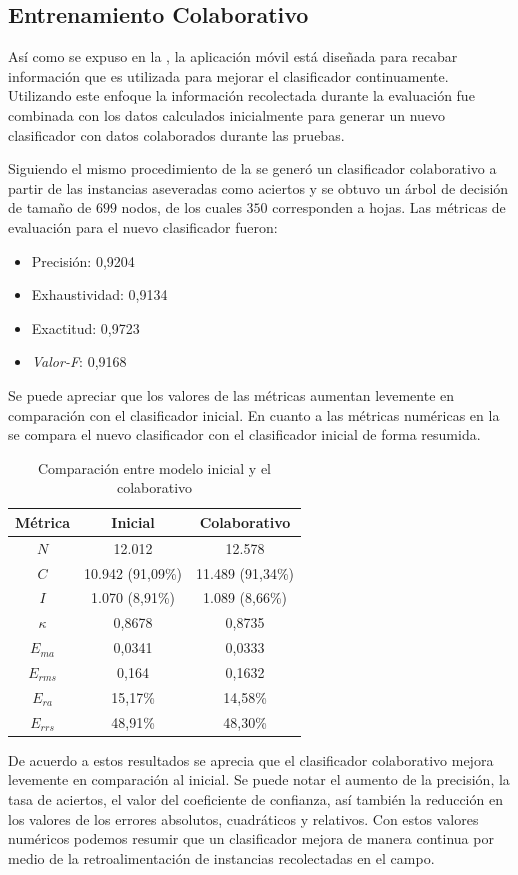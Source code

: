 \subsection{Entrenamiento Colaborativo}

\label{ssec6:colaboracion}Así como se expuso en la ,
la aplicación móvil \emph{} está diseñada para
recabar información que es utilizada para mejorar el clasificador
continuamente. Utilizando este enfoque la información recolectada
durante la evaluación fue combinada con los datos calculados inicialmente
para generar un nuevo clasificador con datos colaborados durante las
pruebas.

Siguiendo el mismo procedimiento de la 
se generó un clasificador colaborativo a partir de las instancias
aseveradas como aciertos y se obtuvo un árbol de decisión de tamaño
de $699$ nodos, de los cuales $350$ corresponden a hojas. Las métricas
de evaluación para el nuevo clasificador fueron:
\begin{itemize}
\item Precisión: 0,9204
\item Exhaustividad: 0,9134
\item Exactitud: 0,9723
\item \emph{Valor-F}: 0,9168
\end{itemize}
Se puede apreciar que los valores de las métricas aumentan levemente
en comparación con el clasificador inicial. En cuanto a las métricas
numéricas en la  se compara el nuevo
clasificador con el clasificador inicial de forma resumida.

\begin{table}[H]
\begin{centering}
\begin{tabular}{|c|c|c|}
\hline 
Métrica & Inicial & Colaborativo\tabularnewline
\hline 
\hline 
$N$ & 12.012 & 12.578\tabularnewline
\hline 
$C$ & 10.942 (91,09\%) & 11.489 (91,34\%)\tabularnewline
\hline 
$I$ & 1.070 (8,91\%) & 1.089 (8,66\%)\tabularnewline
\hline 
$\kappa$ & 0,8678 & 0,8735\tabularnewline
\hline 
$E_{ma}$ & 0,0341 & 0,0333\tabularnewline
\hline 
$E_{rms}$ & 0,164 & 0,1632\tabularnewline
\hline 
$E_{ra}$ & 15,17\% & 14,58\%\tabularnewline
\hline 
$E_{rrs}$ & 48,91\% & 48,30\%\tabularnewline
\hline 
\end{tabular}
\par\end{centering}
\caption{\label{tab6:comparacion-clasi}Comparación entre modelo inicial y
el colaborativo}
\end{table}

De acuerdo a estos resultados se aprecia que el clasificador colaborativo
mejora levemente en comparación al inicial. Se puede notar el aumento
de la precisión, la tasa de aciertos, el valor del coeficiente de
confianza, así también la reducción en los valores de los errores
absolutos, cuadráticos y relativos. Con estos valores numéricos podemos
resumir que un clasificador mejora de manera continua por medio de
la retroalimentación de instancias recolectadas en el campo.
